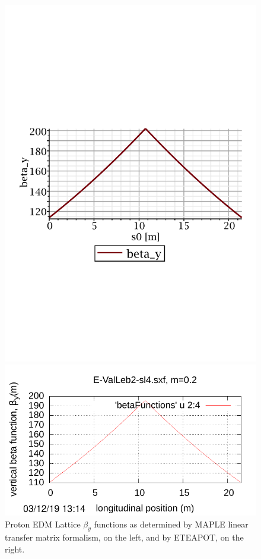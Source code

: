 \documentclass[12]{article}
\begin{document}
\begin{figure}[hbt]
\begin{minipage}{0.5\linewidth}
\centering
\includegraphics[scale=0.4]{pdf/MAPLE-betay_1cell.pdf}
\end{minipage}
\begin{minipage}{0.5\linewidth}
\centering
\includegraphics[scale=0.7]{pdf/BM-IV_Figure2r.pdf}
\end{minipage}
\caption{\label{WollnikVsETEAPOT-y}Proton EDM Lattice $\beta_y$ functions as determined by
MAPLE linear transfer matrix formalism, on the left, and by ETEAPOT, on the right.}
\end{figure}
\end{document}
